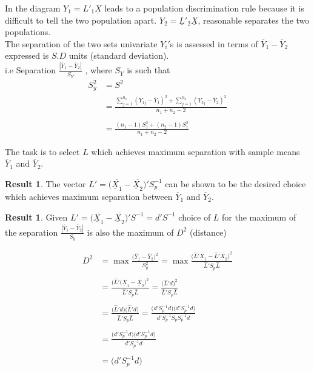 \documentclass[11pt,a4paper]{article}
\theoremstyle{definition}
\newtheorem{result}[thm]{Result}
\begin{document}
In the diagram $Y_1 = L'_1\underline{X}$ leads to a population discrimination rule because it is difficult to tell the two population apart. $Y_2 = \underline{L}'_2\underline{X}$, reasonable separates the two populations.\\

The separation of the two sets univariate $Y_i'$s is assessed in terms of $\overline{Y}_1 - \overline{Y}_2$ expressed is $S.D$ units (standard deviation). \\

i.e Separation $\displaystyle{\frac{|\overline{Y}_1-\overline{Y}_2|}{S_Y}}$ , where $S_Y$  is  such that
\begin{align*}
S^2_y & = S^2\\
      & = \frac{\sum\limits^{n_1}_{j=1}(Y_{1j}-\overline{Y}_1 )^2 + \sum\limits^{n_2}_{j=1}(Y_{2j}-\overline{Y}_2)^2}{n_1+n_2-2}\\\\
      & = \frac{(n_1-1)S^2_1 + (n_2-1)S^2_1}{n_1+n_2-2}\tag{2}
\end{align*}


The task is to select $L$ which achieves maximum separation with sample means $\overline{Y}_1$ and $\overline{Y}_2$.\\


\begin{result}
The vector $\displaystyle{L' = \big(\overline{\underline{X}_1}-\overline{\underline{X}_2}\big)'S^{-1}_p}$ can be shown to be the desired choice which achieves maximum separation between $\overline{Y}_1$ and $\overline{Y}_2$.\\
\end{result}


\begin{result}
Given $\displaystyle{L' = \big(\overline{\underline{X}_1}-\overline{\underline{X}_2}\big)'S^{-1} = d'S^{-1}}$ choice of $L$ for the maximum of the separation $\displaystyle{\frac{|\overline{Y}_1-\overline{Y}_2|}{S_y}}$ is also the maximum of $D^2$ (distance)
\end{result}



\begin{align*}
D^2 & = \max \frac{\big(\overline{Y}_1-\overline{Y}_2\big)^2}{S^2_y}=\max \frac{\big(\widehat{L}'\overline{\underline{X}_1}-\widehat{L}'\overline{\underline{X}_2}\big)^2}{\widehat{L}'S_p\widehat{L}}\\\\
& = \frac{\big(\widehat{L}'\big(\overline{\underline{X}_1}-\overline{\underline{X}_2}\big)^2}{\widehat{L}'S_p\widehat{L}} = \frac{\big(\widehat{L}'d\big)^2}{\widehat{L}'S_p\widehat{L}}\\\\
& = \frac{\big(\widehat{L}'d\big)\big(\widehat{L}'d\big)}{\widehat{L}'S_p\widehat{L}}=\frac{\big(d'S_p^{-1}d\big)\big(d'S_p^{-1}d\big)}{d'S^{-1}_pS_pS^{-1}_pd}\\\\
& = \frac{\big(d'S^{-1}_pd\big)\big(d'S_p^{-1}d\big)}{d'S^{-1}_pd}\\\\
& = \big(d'S^{-1}_pd\big)\tag{3}
\end{align*}
\end{document}
